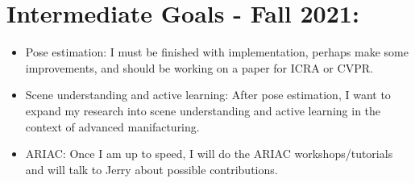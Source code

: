 \documentclass[11pt]{article}
\begin{document}
\section{Intermediate Goals - Fall 2021:}
\begin{itemize}
      \item Pose estimation: I must be finished with implementation, perhaps
      make some improvements, and should be working on a paper for ICRA or CVPR.
      \item Scene understanding and active learning: After pose estimation, I
      want to expand my research into scene understanding and active learning in
      the context of advanced manifacturing.
      \item ARIAC: Once I am up to speed, I will do the ARIAC workshops/tutorials
      and will talk to Jerry about possible contributions.
\end{itemize}


\newpage


\end{document}
